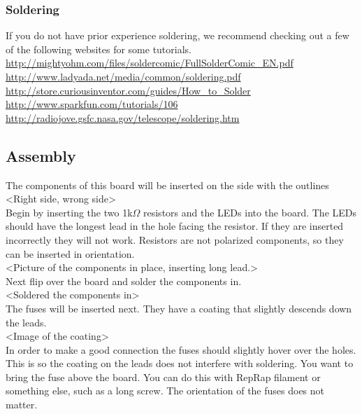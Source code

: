 \documentclass{article}
\begin{document}
\subsubsection{Soldering}
  If you do not have prior experience soldering, we recommend checking out a few of the following websites for some tutorials. \\
    \url{http://mightyohm.com/files/soldercomic/FullSolderComic_EN.pdf} \\
    \url{http://www.ladyada.net/media/common/soldering.pdf} \\
    \url{http://store.curiousinventor.com/guides/How_to_Solder} \\
    \url{http://www.sparkfun.com/tutorials/106} \\
    \url{http://radiojove.gsfc.nasa.gov/telescope/soldering.htm}

\subsection{Assembly}
  The components of this board will be inserted on the side with the outlines\\

  <Right side, wrong side>
  \\
  Begin by inserting the two 1k$\Omega$ resistors and the LEDs into the board. The LEDs should have the longest lead in the hole facing the resistor. If they are inserted incorrectly they will not work. Resistors are not polarized components, so they can be inserted in orientation. \\

  <Picture of the components in place, inserting long lead.> 
\\
  Next flip over the board and solder the components in. \\

<Soldered the components in> \\

  The fuses will be inserted next. They have a coating that slightly descends down the leads. \\

<Image of the coating>\\

 In order to make a good connection the fuses should slightly hover over the holes. This is so the coating on the leads does not interfere with soldering. You want to bring the fuse above the board. You can do this with RepRap filament or something else, such as a long screw. The orientation of the fuses does not matter. \\
\end{document}
